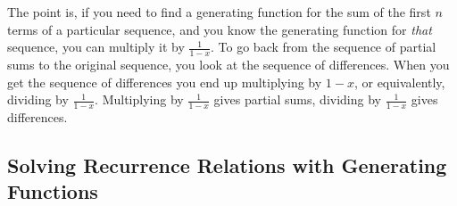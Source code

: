 \documentclass[10pt,]{book}
\theoremstyle{plain}
\theoremstyle{definition}
\theoremstyle{definition}
\theoremstyle{definition}
\numberwithin{equation}{chapter}
\begin{document}
The point is, if you need to find a generating function for the sum of the first \(n\) terms of a particular sequence, and you know the generating function for \emph{that} sequence, you can multiply it by  \(\frac{1}{1-x}\). To go back from the sequence of partial sums to the original sequence, you look at the sequence of differences. When you get the sequence of differences you end up multiplying by \(1-x\), or equivalently, dividing by \(\frac{1}{1-x}\). Multiplying by \(\frac{1}{1-x}\) gives partial sums, dividing by \(\frac{1}{1-x}\) gives differences.
%
\typeout{************************************************}
\typeout{************************************************}
\subsection[Solving Recurrence Relations with Generating Functions]{Solving Recurrence Relations with Generating Functions}\label{subsection-45}
\end{document}
